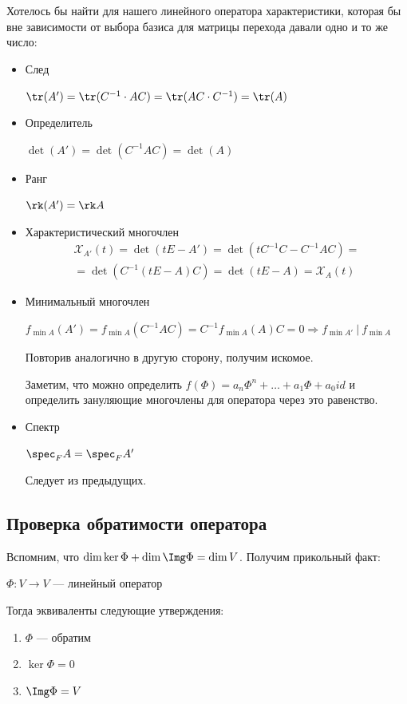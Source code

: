 Хотелось бы найти для нашего линейного оператора характеристики,
которая бы вне зависимости от выбора базиса для матрицы перехода
давали одно и то же число:
\begin{itemize}
    \item
        След

        \( \tr (A') = \tr (C^{-1} \cdot A C) = \tr (AC \cdot C^{-1}) = \tr (A) \)
    \item
        Определитель

        \( \det (A') = \det (C^{-1} AC) = \det (A) \)
    \item
        Ранг

        \( \rk (A') = \rk A \)
    \item
        Характеристический многочлен
        \begin{gather*}
            \mathcal{X}_{A'} (t) = \det (tE - A') = \det(tC^{-1}C - C^{-1} A C) =
            \\
            = \det(C^{-1} (tE - A) C) = \det(tE - A) = \mathcal{X}_A (t)
        \end{gather*}
    \item
        Минимальный многочлен

        \( f_{\min A} (A') = f_{\min A} ( C^{-1}AC ) = C^{-1} f_{\min A} (A) C = 0 \Rightarrow f_{\min A'} \: | \: f_{\min A} \)

        Повторив аналогично в другую сторону, получим искомое.

        Заметим, что можно определить \( f(\Phi) = a_n \Phi^n + \ldots + a_1 \Phi + a_0 id \)
        и определить зануляющие многочлены для оператора через это равенство.
    \item
        Спектр

        \( \spec_F A = \spec_F A' \)

        Следует из предыдущих.
\end{itemize}

\subsection{Проверка обратимости оператора}

Вспомним, что \( \dim \ker \Phi + \dim \Img \Phi = \dim V \). Получим прикольный факт:
\begin{obs}{}{}
    \( \Phi : V \to V \) --- линейный оператор

    Тогда эквиваленты следующие утверждения:
    \begin{enumerate}
        \item
            \( \Phi \) --- обратим
        \item
            \( \ker \Phi = 0 \)
        \item
            \( \Img \Phi = V \)
    \end{enumerate}
\end{obs}

